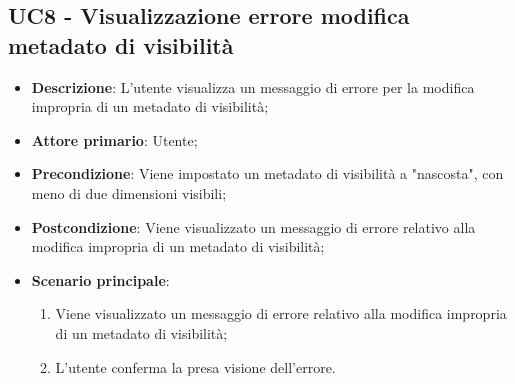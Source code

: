 \subsection{UC8 - Visualizzazione errore modifica metadato di visibilità}
\label{sub:uc8}

\begin{itemize}
    \item \textbf{Descrizione}: L'utente visualizza un messaggio di errore per la modifica impropria di un metadato di 
    visibilità;

    \item \textbf{Attore primario}: Utente;
    
    \item \textbf{Precondizione}:   Viene impostato un metadato di visibilità a "nascosta", con meno di due dimensioni 
    visibili;

    \item \textbf{Postcondizione}:   Viene visualizzato un messaggio di errore relativo alla modifica impropria di un 
    metadato di visibilità;

    \item \textbf{Scenario principale}:
    \begin{enumerate}
        \item Viene visualizzato un messaggio di errore relativo alla modifica impropria di un metadato di visibilità;
        \item L'utente conferma la presa visione dell'errore.
    \end{enumerate}
\end{itemize}